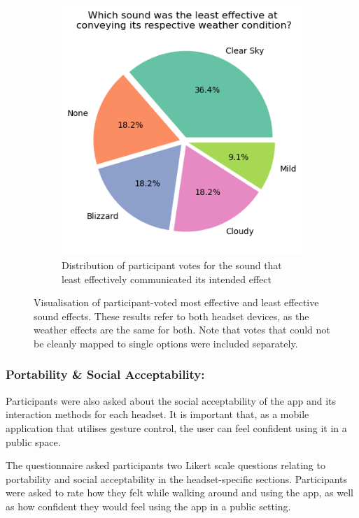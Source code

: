 \documentclass{l4proj}
\begin{document}
\begin{figure}[htb!]
\begin{subfigure}[b]{0.7\textwidth}
        \includegraphics[width=\textwidth]{images/graphs/least_effective_pie.png}
        \caption{Distribution of participant votes for the sound that least effectively communicated its intended effect}
        \label{fig:syn2}
    \end{subfigure}
    \caption{Visualisation of participant-voted most effective and least effective sound effects. These results refer to both headset devices, as the weather effects are the same for both. Note that votes that could not be cleanly mapped to single options were included separately.
    }\label{fig:audio_preference_graphs}
\end{figure}

\subsubsection{Portability \& Social Acceptability: }
Participants were also asked about the social acceptability of the app and its interaction methods for each headset. It is important that, as a mobile application that utilises gesture control, the user can feel confident using it in a public space.

The questionnaire asked participants two Likert scale questions relating to portability and social acceptability in the headset-specific sections. Participants were asked to rate how they felt while walking around and using the app, as well as how confident they would feel using the app in a public setting.
\end{document}
